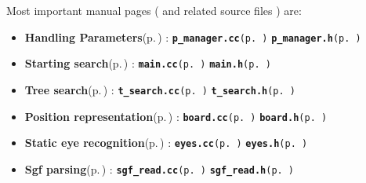 Most important manual pages ( and related source files ) are:\begin{itemize}
\item {\bf Handling Parameters}{\rm (p.\,\pageref{page_1})} : {\tt {\bf p\_\-manager.cc}{\rm (p.\,\pageref{p__manager_8cc})}} {\tt {\bf p\_\-manager.h}{\rm (p.\,\pageref{p__manager_8h})}} \item {\bf Starting search}{\rm (p.\,\pageref{page_2})} : {\tt {\bf main.cc}{\rm (p.\,\pageref{main_8cc})}} {\tt {\bf main.h}{\rm (p.\,\pageref{main_8h})}} \item {\bf Tree search}{\rm (p.\,\pageref{page_3})} : {\tt {\bf t\_\-search.cc}{\rm (p.\,\pageref{t__search_8cc})}} {\tt {\bf t\_\-search.h}{\rm (p.\,\pageref{t__search_8h})}} \item {\bf Position representation}{\rm (p.\,\pageref{page_6})} : {\tt {\bf board.cc}{\rm (p.\,\pageref{board_8cc})}} {\tt {\bf board.h}{\rm (p.\,\pageref{board_8h})}} \item {\bf Static eye recognition}{\rm (p.\,\pageref{page_4})} : {\tt {\bf eyes.cc}{\rm (p.\,\pageref{eyes_8cc})}} {\tt {\bf eyes.h}{\rm (p.\,\pageref{eyes_8h})}} \item {\bf Sgf parsing}{\rm (p.\,\pageref{page_5})} : {\tt {\bf sgf\_\-read.cc}{\rm (p.\,\pageref{sgf__read_8cc})}} {\tt {\bf sgf\_\-read.h}{\rm (p.\,\pageref{sgf__read_8h})}} \end{itemize}
